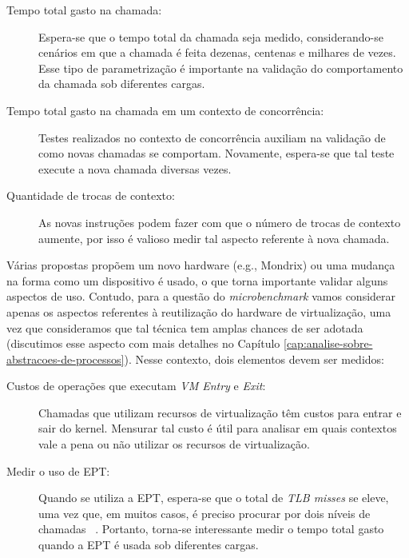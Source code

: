 \begin{description}
  \item [Tempo total gasto na chamada:]

Espera-se que o tempo total da chamada seja medido, considerando-se cenários em
que a chamada é feita dezenas, centenas e milhares de vezes. Esse tipo de
parametrização é importante na validação do comportamento da chamada sob
diferentes cargas.

  \item [Tempo total gasto na chamada em um contexto de concorrência:]

Testes realizados no contexto de concorrência auxiliam na validação de como
novas chamadas se comportam. Novamente, espera-se que tal teste execute
a nova chamada diversas vezes.

  \item [Quantidade de trocas de contexto:]

As novas instruções podem fazer com que o número de trocas de contexto aumente,
por isso é valioso medir tal aspecto referente à nova chamada.

\end{description}

Várias propostas propõem um novo hardware (e.g., Mondrix) ou uma mudança na
forma como um dispositivo é usado, o que torna importante validar alguns
aspectos de uso. Contudo, para a questão do \textit{microbenchmark} vamos
considerar apenas os aspectos referentes à reutilização do hardware de
virtualização, uma vez que consideramos que tal técnica tem amplas chances de
ser adotada (discutimos esse aspecto com mais detalhes no Capítulo
\ref{cap:analise-sobre-abstracoes-de-processos}). Nesse contexto, dois
elementos devem ser medidos:

\begin{description}

  \item [Custos de operações que executam \textit{VM Entry} e \textit{Exit}:]

Chamadas que utilizam recursos de virtualização têm custos para entrar e sair
do kernel. Mensurar tal custo é útil para analisar em quais contextos vale a pena
ou não utilizar os recursos de virtualização.

  \item [Medir o uso de EPT:]

Quando se utiliza a EPT, espera-se que o total de \textit{TLB misses} se eleve,
uma vez que, em muitos casos, é preciso procurar por dois níveis de chamadas
~\citep{belay}. Portanto, torna-se interessante medir o tempo total gasto
quando a EPT é usada sob diferentes cargas.

\end{description}

